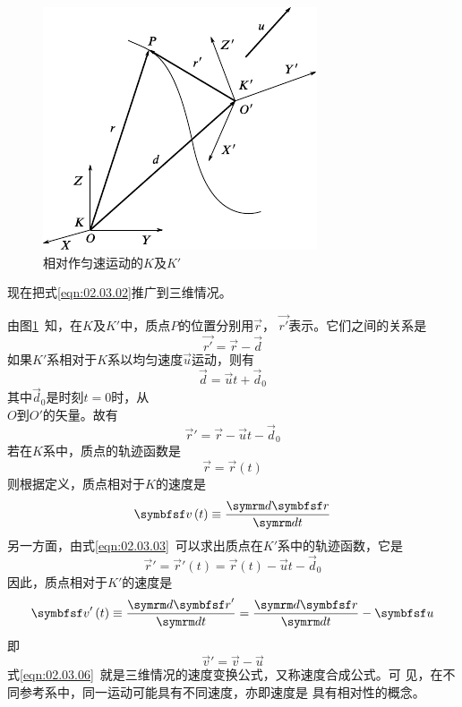 \begin{figure}
  \centering
  \includegraphics{figure/fig02.07}
  \caption{相对作匀速运动的$K$及$K'$}
  \label{fig:02.07}
\end{figure}
现在把式\eqref{eqn:02.03.02}推广到三维情况。

由图\ref{fig:02.07}~知，在$K$及$K'$中，质点$P$的位置分别用$\vec{r}$，
$\vec{r'}$表示。它们之间的关系是
{\setlength{\mathindent}{4em}
\begin{equation*}
  \vec{r'}=\vec{r}-\vec{d}
\end{equation*}}%
如果$K'$系相对于$K$系以均匀速度$\vec{u}$运动，则有
{\setlength{\mathindent}{4em}
\begin{equation*}
  \vec{d}=\vec{u}t+\vec{d}_0
\end{equation*}}%
其中$\vec{d}_0$是时刻$t=0$时，从\\$O$到$O'$的矢量。故有
  \begin{equation}
    \vec{r}'=\vec{r}-\vec{u}t-\vec{d}_0 \label{eqn:02.03.03}
  \end{equation}
  若在$K$系中，质点的轨迹函数是
  \begin{equation*}
    \vec{r}=\vec{r}\left(t\right)
  \end{equation*}
  则根据定义，质点相对于$K$的速度是
  \begin{equation}\label{eqn:02.03.04}
    \vec{v}\left(t\right)\equiv\frac{\dif \vec{r}}{\dif t}
  \end{equation}
  另一方面，由式\eqref{eqn:02.03.03}~可以求出质点在$K'$系中的轨迹函数，它是\vspace{-1em}
  \begin{equation*}
    \vec{r}'=\vec{r}'\left(t\right)=\vec{r}\left(t\right)-\vec{u}t-\vec{d}_0
  \end{equation*}\label{err:02.03.02}
  因此，质点相对于$ K' $的速度是
  \begin{equation}\label{eqn:02.03.05}
    \vec{v}'\left(t\right)\equiv\frac{\dif \vec{r}'}{\dif t}=\frac{\dif \vec{r}}{\dif t}-\vec{u}
  \end{equation}
  即\vspace{-2em}
  \begin{equation}\label{eqn:02.03.06}
    \vec{v}'=\vec{v}-\vec{u}
  \end{equation}
  式\eqref{eqn:02.03.06}~就是三维情况的速度变换公式，又称速度合成公式。可
  见，在不同参考系中，同一运动可能具有不同速度，亦即速度是
  具有相对性的概念。

